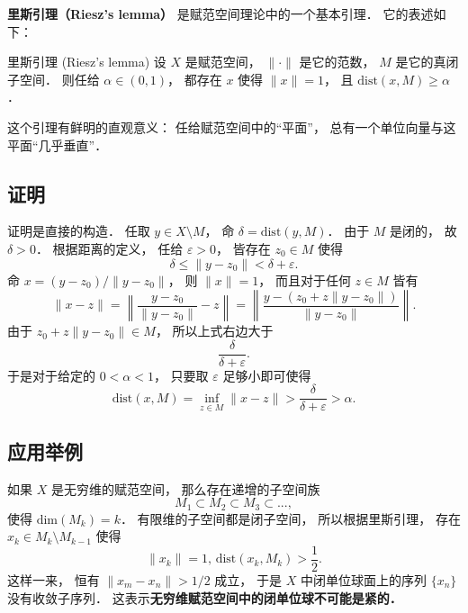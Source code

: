 
\begin{issues}
\issueNeedCite
\end{issues}


\textbf{里斯引理（Riesz's lemma）} 是赋范空间理论中的一个基本引理． 它的表述如下：

\begin{lemma}{里斯引理 (Riesz's lemma)}
设 $X$ 是赋范空间， $\|\cdot\|$ 是它的范数， $M$ 是它的真闭子空间． 则任给 $\alpha\in(0,1)$， 都存在 $x$ 使得 $\|x\|=1$， 且 $\text{dist}(x,M)\geq\alpha$．
\end{lemma}

这个引理有鲜明的直观意义： 任给赋范空间中的“平面”， 总有一个单位向量与这平面“几乎垂直”．

\subsection{证明}
证明是直接的构造． 任取 $y\in X\setminus M$， 命 $\delta=\text{dist}(y,M)$． 由于 $M$ 是闭的， 故 $\delta>0$． 根据距离的定义， 任给 $\varepsilon>0$， 皆存在 $z_0\in M$ 使得
$$
\delta\leq \|y-z_0\|<\delta+\varepsilon.
$$
命 $x=(y-z_0)/\|y-z_0\|$， 则 $\|x\|=1$， 而且对于任何 $z\in M$ 皆有
$$
\|x-z\|
=\left\|\frac{y-z_0}{\|y-z_0\|}-z\right\|
=\left\|\frac{y-(z_0+z\|y-z_0\|)}{\|y-z_0\|}\right\|.
$$
由于 $z_0+z\|y-z_0\|\in M$， 所以上式右边大于
$$
\frac{\delta}{\delta+\varepsilon}.
$$
于是对于给定的 $0<\alpha<1$， 只要取 $\varepsilon$ 足够小即可使得
$$
\text{dist}(x,M)
=\inf_{z\in M}\|x-z\|
>\frac{\delta}{\delta+\varepsilon}
>\alpha.
$$

\subsection{应用举例}
如果 $X$ 是无穷维的赋范空间， 那么存在递增的子空间族
$$
M_1\subset M_2\subset M_3\subset...,
$$
使得 $\text{dim}(M_k)=k$． 有限维的子空间都是闭子空间， 所以根据里斯引理， 存在 $x_k\in M_k\setminus M_{k-1}$ 使得
$$
\|x_k\|=1,\,\text{dist}(x_k,M_k)>\frac{1}{2}.
$$
这样一来， 恒有 $\|x_m-x_n\|>1/2$ 成立， 于是 $X$ 中闭单位球面上的序列 $\{x_n\}$ 没有收敛子序列． 这表示\textbf{无穷维赋范空间中的闭单位球不可能是紧的．}